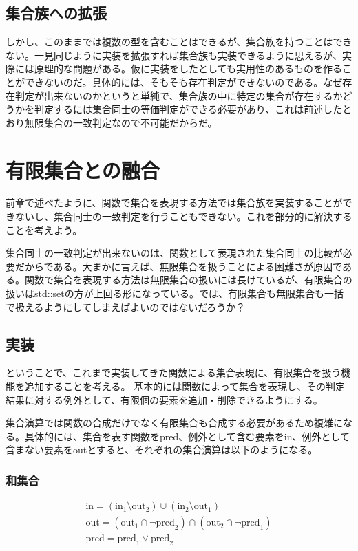 \documentclass[a4paper,11pt]{ltjsarticle}
\begin{document}
\subsection{集合族への拡張}
しかし、このままでは複数の型を含むことはできるが、集合族を持つことはできない。一見同じように実装を拡張すれば集合族も実装できるように思えるが、実際には原理的な問題がある。仮に実装をしたとしても実用性のあるものを作ることができないのだ。具体的には、そもそも存在判定ができないのである。なぜ存在判定が出来ないのかというと単純で、集合族の中に特定の集合が存在するかどうかを判定するには集合同士の等価判定ができる必要があり、これは前述したとおり無限集合の一致判定なので不可能だからだ。
\section{有限集合との融合}
前章で述べたように、関数で集合を表現する方法では集合族を実装することができないし、集合同士の一致判定を行うこともできない。これを部分的に解決することを考えよう。

集合同士の一致判定が出来ないのは、関数として表現された集合同士の比較が必要だからである。大まかに言えば、無限集合を扱うことによる困難さが原因である。関数で集合を表現する方法は無限集合の扱いには長けているが、有限集合の扱いはstd::setの方が上回る形になっている。では、有限集合も無限集合も一括で扱えるようにしてしまえばよいのではないだろうか？
\subsection{実装}
ということで、これまで実装してきた関数による集合表現に、有限集合を扱う機能を追加することを考える。
基本的には関数によって集合を表現し、その判定結果に対する例外として、有限個の要素を追加・削除できるようにする。

集合演算では関数の合成だけでなく有限集合も合成する必要があるため複雑になる。具体的には、集合を表す関数をpred、例外として含む要素をin、例外として含まない要素をoutとすると、それぞれの集合演算は以下のようになる。
\subsubsection{和集合}

\[
\begin{array}{l}
\mathrm{in}
=
(\mathrm{in}_1\setminus\mathrm{out}_2)
\cup
(\mathrm{in}_2\setminus\mathrm{out}_1)
\\[2mm]
\mathrm{out}
=
(\mathrm{out}_1\cap\lnot\mathrm{pred}_2)
\cap
(\mathrm{out}_2\cap\lnot\mathrm{pred}_1)
\\[2mm]
\mathrm{pred}
=
\mathrm{pred}_1\lor\mathrm{pred}_2
\end{array}
\]
\end{document}
